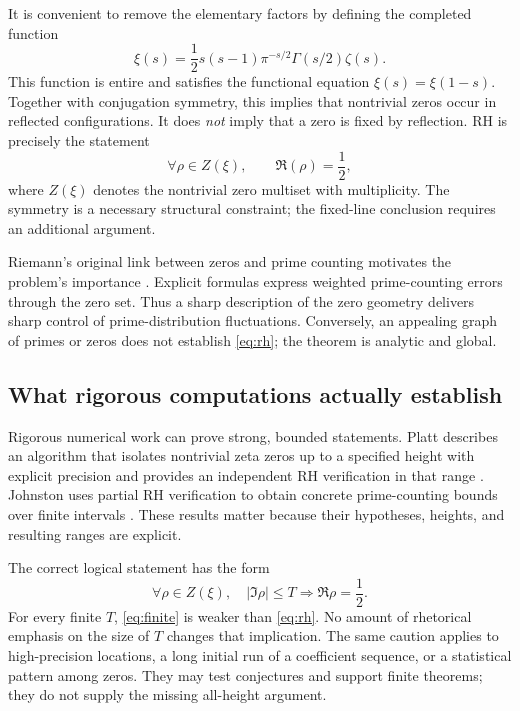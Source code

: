 \documentclass[conference]{../../../../Conference-LaTeX-template_10-17-19/IEEEtran}
\begin{document}
It is convenient to remove the elementary factors by defining the completed function
\begin{equation}
 \xi(s)=\frac{1}{2}s(s-1)\pi^{-s/2}\Gamma(s/2)\zeta(s).
\label{eq:xi}
\end{equation}
This function is entire and satisfies the functional equation $\xi(s)=\xi(1-s)$. Together with conjugation symmetry, this implies that nontrivial zeros occur in reflected configurations. It does \emph{not} imply that a zero is fixed by reflection. RH is precisely the statement
\begin{equation}
 \forall\rho\in Z(\xi),\qquad \Re(\rho)=\frac12,
\label{eq:rh}
\end{equation}
where $Z(\xi)$ denotes the nontrivial zero multiset with multiplicity. The symmetry is a necessary structural constraint; the fixed-line conclusion requires an additional argument.

Riemann's original link between zeros and prime counting motivates the problem's importance \cite{riemann}. Explicit formulas express weighted prime-counting errors through the zero set. Thus a sharp description of the zero geometry delivers sharp control of prime-distribution fluctuations. Conversely, an appealing graph of primes or zeros does not establish \eqref{eq:rh}; the theorem is analytic and global.

\subsection{What rigorous computations actually establish}
Rigorous numerical work can prove strong, bounded statements. Platt describes an algorithm that isolates nontrivial zeta zeros up to a specified height with explicit precision and provides an independent RH verification in that range \cite{platt}. Johnston uses partial RH verification to obtain concrete prime-counting bounds over finite intervals \cite{johnston}. These results matter because their hypotheses, heights, and resulting ranges are explicit.

The correct logical statement has the form
\begin{equation}
 \forall\rho\in Z(\xi),\quad |\Im\rho|\le T\Longrightarrow \Re\rho=\frac12.
\label{eq:finite}
\end{equation}
For every finite $T$, \eqref{eq:finite} is weaker than \eqref{eq:rh}. No amount of rhetorical emphasis on the size of $T$ changes that implication. The same caution applies to high-precision locations, a long initial run of a coefficient sequence, or a statistical pattern among zeros. They may test conjectures and support finite theorems; they do not supply the missing all-height argument.
\end{document}
